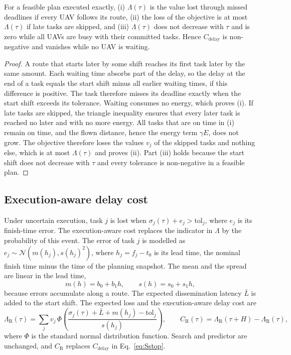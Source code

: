 \begin{prop}\label{prop:delay}
For a feasible plan executed exactly, (i) $\Lambda(\tau)$ is the value lost through missed deadlines if every UAV
follows its route, (ii) the loss of the objective is at most $\Lambda(\tau)$ if late tasks are skipped, and
(iii) $\Lambda(\tau)$ does not decrease with $\tau$ and is zero while all UAVs are busy with their committed tasks.
Hence $C_{\mathrm{delay}}$ is non-negative and vanishes while no UAV is waiting.
\end{prop}
\begin{proof}
A route that starts later by some shift reaches its first task later by the same amount. Each waiting time absorbs part
of the delay, so the delay at the end of a task equals the start shift minus all earlier waiting times, if this
difference is positive. The task therefore misses its deadline exactly when the start shift exceeds its tolerance.
Waiting consumes no energy, which proves (i). If late tasks are skipped, the triangle inequality ensures that every
later task is reached no later and with no more energy. All tasks that are on time in (i) remain on time, and the flown
distance, hence the energy term $\gamma E$, does not grow. The objective therefore loses the values $v_j$ of the skipped
tasks and nothing else, which is at most $\Lambda(\tau)$ and proves (ii). Part (iii) holds because the start shift does
not decrease with $\tau$ and every tolerance is non-negative in a feasible plan.
\end{proof}

\subsection{Execution-aware delay cost}\label{sec:Srisk}
Under uncertain execution, task $j$ is lost when $\sigma_j(\tau)+e_j>\mathrm{tol}_j$, where $e_j$ is its finish-time
error. The execution-aware cost replaces the indicator in $\Lambda$ by the probability of this event. The error of task
$j$ is modelled as $e_j\sim\mathcal{N}(m(h_j),s(h_j)^2)$, where $h_j=f_j-t_0$ is its lead time, the nominal finish time
minus the time of the planning snapshot. The mean and the spread are linear in the lead time,
\begin{equation}\label{eq:Serrmodel}
m(h)=b_0+b_1h,\qquad s(h)=s_0+s_1h,
\end{equation}
because errors accumulate along a route. The expected dissemination latency $\bar L$ is added to the start shift. The
expected loss and the execution-aware delay cost are
\begin{equation}\label{eq:Srisk}
\Lambda_{\mathrm{R}}(\tau)=\sum_j v_j\,\Phi\!\left(\frac{\sigma_j(\tau)+\bar L+m(h_j)-\mathrm{tol}_j}{s(h_j)}\right),
\qquad C_{\mathrm{R}}(\tau)=\Lambda_{\mathrm{R}}(\tau+H)-\Lambda_{\mathrm{R}}(\tau),
\end{equation}
where $\Phi$ is the standard normal distribution function. Search and predictor are unchanged, and $C_{\mathrm{R}}$
replaces $C_{\mathrm{delay}}$ in Eq.~\eqref{eq:Sstop}.

